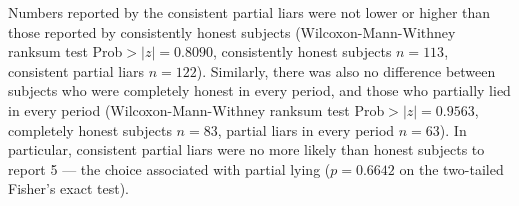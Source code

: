 \documentclass[12pt]{article}
\begin{document}
\par Numbers reported by the consistent partial liars were not lower or higher than those reported by consistently honest subjects (Wilcoxon-Mann-Withney ranksum test Prob$>|z|=0.8090$, consistently honest subjects $n=113$, consistent partial liars $n=122$). Similarly, there was also no difference between subjects who were completely honest in every period, and those who partially lied in every period (Wilcoxon-Mann-Withney ranksum test Prob$>|z|=0.9563$, completely honest subjects $n=83$, partial liars in every period $n=63$).\footnotemark{}
In particular, consistent partial liars were no more likely than honest subjects to report 5 --- the choice associated with partial lying ($p=0.6642$ on the two-tailed Fisher's exact test).\footnotemark{} \label{stata:rep5}

\label{stata:robustcheat_ranksum}
\end{document}
